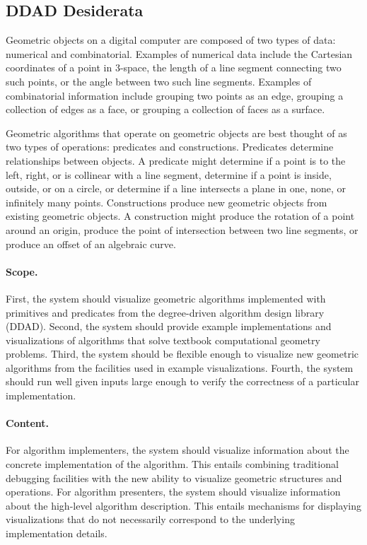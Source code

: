 \subsection{DDAD Desiderata}

Geometric objects on a digital computer are composed of two types of data:
numerical and combinatorial. Examples of numerical data include the
Cartesian coordinates of a point in 3-space, the length of a line segment
connecting two such points, or the angle between two such line segments.
Examples of combinatorial information include grouping two points as an
edge, grouping a collection of edges as a face, or grouping a collection of
faces as a surface.

Geometric algorithms that operate on geometric objects are best thought of as
two types of operations: predicates and constructions. Predicates determine
relationships between objects. A predicate might determine if a point is to
the left, right, or is collinear with a line segment, determine if a point is
inside, outside, or on a circle, or determine if a line intersects a plane in
one, none, or infinitely many points. Constructions produce new geometric
objects from existing geometric objects. A construction might produce the
rotation of a point around an origin, produce the point of intersection
between two line segments, or produce an offset of an algebraic curve.

\paragraph{Scope.} First, the system should visualize geometric algorithms
implemented with primitives and predicates from the degree-driven algorithm
design library (DDAD). Second, the system should provide example implementations
and visualizations of algorithms that solve textbook computational geometry
problems. Third, the system should be flexible enough to visualize new geometric
algorithms from the facilities used in example visualizations. Fourth, the
system should run well given inputs large enough to verify the correctness of a
particular implementation.

\paragraph{Content.} For algorithm implementers, the system should
visualize information about the concrete implementation of the algorithm. This
entails combining traditional debugging facilities with the new ability to
visualize geometric structures and operations. For algorithm presenters, the
system should visualize information about the high-level algorithm description.
This entails mechanisms for displaying visualizations that do not necessarily
correspond to the underlying implementation details.

